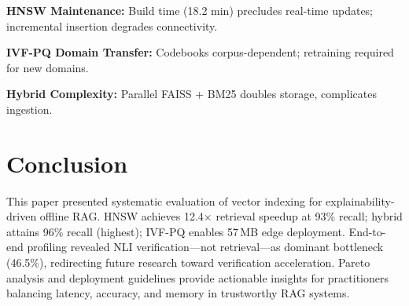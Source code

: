 \documentclass[conference]{IEEEtran}
\begin{document}
\textbf{HNSW Maintenance:} Build time (18.2 min) precludes real-time updates; incremental insertion degrades connectivity.

\textbf{IVF-PQ Domain Transfer:} Codebooks corpus-dependent; retraining required for new domains.

\textbf{Hybrid Complexity:} Parallel FAISS + BM25 doubles storage, complicates ingestion.

\section{Conclusion}

This paper presented systematic evaluation of vector indexing for explainability-driven offline RAG. HNSW achieves 12.4$\times$ retrieval speedup at 93\% recall; hybrid attains 96\% recall (highest); IVF-PQ enables 57\,MB edge deployment. End-to-end profiling revealed NLI verification—not retrieval—as dominant bottleneck (46.5\%), redirecting future research toward verification acceleration. Pareto analysis and deployment guidelines provide actionable insights for practitioners balancing latency, accuracy, and memory in trustworthy RAG systems.



\end{document}
